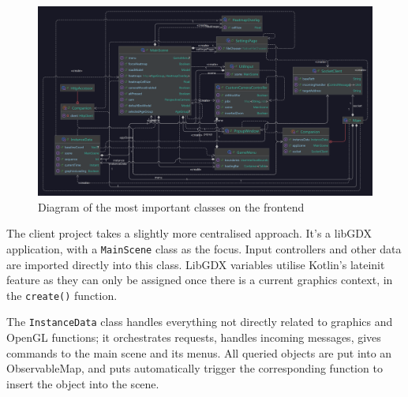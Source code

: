 \begin{figure}[!ht]
    \centering
    \includegraphics[width=140mm, keepaspectratio]{images/frontend-classes.png}
    \caption{Diagram of the most important classes on the frontend}
\end{figure}

The client project takes a slightly more centralised approach. It's a libGDX application, with a \verb|MainScene| class as the focus. Input controllers and other data are imported directly into this class. LibGDX variables utilise Kotlin's lateinit feature as they can only be assigned once there is a current graphics context, in the \verb|create()| function.

The \verb|InstanceData| class handles everything not directly related to graphics and OpenGL functions; it orchestrates requests, handles incoming messages, gives commands to the main scene and its menus. All queried objects are put into an ObservableMap, and puts automatically trigger the corresponding function to insert the object into the scene.